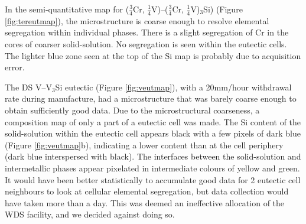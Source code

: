 In the semi-quantitative map for ($\frac{3}{4}$Cr, $\frac{1}{4}$V)--($\frac{3}{4}$Cr, $\frac{1}{4}$V)$_3$Si) (Figure \ref{fig:tereutmap}), the microstructure is coarse enough to resolve elemental segregation within individual phases.  There is a slight segregation of Cr in the cores of coarser solid-solution.  No segregation is seen within the  eutectic cells.  The lighter blue zone seen at the top of the Si map is probably due to acquisition error.

The DS V--V$_3$Si eutectic (Figure \ref{fig:veutmap}), with a 20mm/hour withdrawal rate during manufacture, had a microstructure that was barely coarse enough to obtain sufficiently good data.  Due to the microstructural coarseness, a composition map of only a part of a eutectic cell was made.  The Si content of the solid-solution within the eutectic cell appears black with a few pixels of dark blue (Figure \ref{fig:veutmap}b), indicating a lower content than at the cell periphery (dark blue interspersed with black).  The interfaces between the solid-solution and intermetallic phases appear pixelated in intermediate colours of yellow and green.  It would have been better statistically to accumulate good data for 2 eutectic cell neighbours to look at cellular elemental segregation, but data collection would have taken more than a day.  This was deemed an ineffective allocation of the WDS facility, and we decided against doing so.

